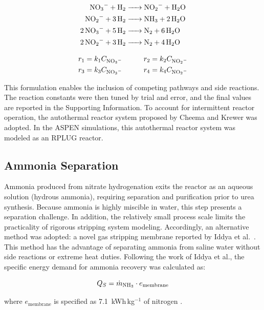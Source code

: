 \documentclass[letterpaper]{article}
\begin{document}
\begin{align}
\ce{NO3- + H2 &-> NO2- + H2O} \\
\ce{NO2- + 3H2 &-> NH3 + 2H2O} \\
\ce{2NO3- + 5H2 &-> N2 + 6H2O} \\
\ce{2NO2- + 3H2 &-> N2 + 4H2O}
\end{align}

\begin{equation}
\begin{aligned}
r_1 &= k_1 C_{\ce{NO3-}} & \qquad r_2 &= k_2 C_{\ce{NO2-}} \\
r_3 &= k_3 C_{\ce{NO3-}} & \qquad r_4 &= k_4 C_{\ce{NO2-}}
\end{aligned}
\end{equation}

\noindent This formulation enables the inclusion of competing pathways
and side reactions. The reaction constants were then tuned by trial
and error, and the final values are reported in the Supporting
Information. To account for intermittent reactor operation, the
autothermal reactor system proposed by Cheema and Krewer
\cite{Cheema2018} was adopted. In the ASPEN simulations, this
autothermal reactor system was modeled as an RPLUG reactor.

\subsection{Ammonia Separation}
Ammonia produced from nitrate hydrogenation exits the reactor as an
aqueous solution (hydrous ammonia), requiring separation and
purification prior to urea synthesis. Because ammonia is highly
miscible in water, this step presents a separation challenge. In
addition, the relatively small process scale limits the practicality
of rigorous stripping system modeling. Accordingly, an alternative
method was adopted: a novel gas stripping membrane reported by Iddya
et al.\ \cite{Iddya2020}. This method has the advantage of separating
ammonia from saline water without side reactions or extreme heat
duties. Following the work of Iddya et al., the specific energy
demand for ammonia recovery was calculated as:

\begin{equation}
Q_S = \dot m_{\ce{NH3}} \cdot e_{\mathrm{membrane}}
\end{equation}

\noindent where $e_{\mathrm{membrane}}$ is specified as
7.1~kWh\,kg$^{-1}$ of nitrogen \cite{Iddya2020}.
\end{document}
